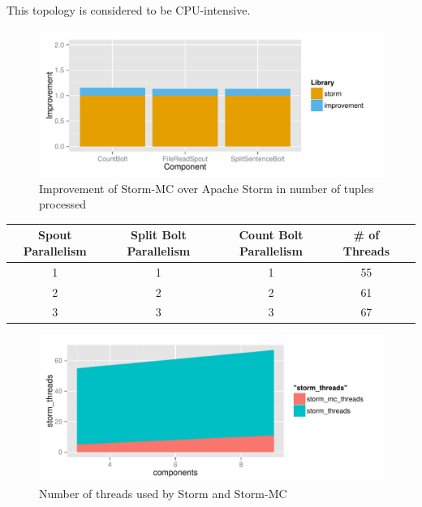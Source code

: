 \documentclass[bsc,logo,frontabs,twoside,singlespacing,normalheadings,parskip]{infthesis}\usepackage[]{graphicx}\usepackage[]{color}
\makeatletter
\def\maxwidth{ %
  \ifdim\Gin@nat@width>\linewidth
    \linewidth
  \else
    \Gin@nat@width
  \fi
}
\newenvironment{knitrout}{}{} %
\makeatother
\begin{document}
This topology is considered to be CPU-intensive.

\begin{knitrout}
\color{fgcolor}\begin{figure}

{\centering \includegraphics[width=\maxwidth]{figure/wordcount-plot-1} 

}

\caption[Improvement of Storm-MC over Apache Storm in number of tuples processed]{Improvement of Storm-MC over Apache Storm in number of tuples processed}\label{fig:wordcount-plot}
\end{figure}


\end{knitrout}

\begin{tabular}{c c c c c} \toprule
    {Spout Parallelism} & {Split Bolt Parallelism} & {Count Bolt Parallelism} & {\# of Threads} \\ \midrule
    1 & 1 & 1 & 55  \\ \midrule
    2 & 2 & 2 & 61  \\ \midrule
    3 & 3 & 3 & 67  \\ \bottomrule
\end{tabular}

\begin{knitrout}
\color{fgcolor}\begin{figure}

{\centering \includegraphics[width=\maxwidth]{figure/threads-plot-1} 

}

\caption[Number of threads used by Storm and Storm-MC]{Number of threads used by Storm and Storm-MC}\label{fig:threads-plot}
\end{figure}


\end{knitrout}
\end{document}
